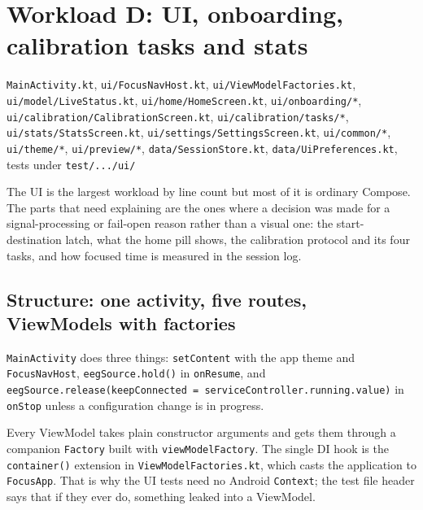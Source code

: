 \documentclass[10pt,a4paper]{article}
\newcommand{\file}[1]{\texttt{\small #1}}          %
\newcommand{\code}[1]{\texttt{#1}}                  %
\begin{document}
\section{Workload D: UI, onboarding, calibration tasks and stats}\label{sec:d}

\begin{files}
\file{MainActivity.kt}, \file{ui/FocusNavHost.kt}, \file{ui/ViewModelFactories.kt},
\file{ui/model/LiveStatus.kt}, \file{ui/home/HomeScreen.kt}, \file{ui/onboarding/*},
\file{ui/calibration/CalibrationScreen.kt}, \file{ui/calibration/tasks/*},
\file{ui/stats/StatsScreen.kt}, \file{ui/settings/SettingsScreen.kt}, \file{ui/common/*},
\file{ui/theme/*}, \file{ui/preview/*}, \file{data/SessionStore.kt}, \file{data/UiPreferences.kt},
tests under \file{test/.../ui/}
\end{files}

The UI is the largest workload by line count but most of it is ordinary Compose. The parts
that need explaining are the ones where a decision was made for a signal-processing or
fail-open reason rather than a visual one: the start-destination latch, what the home pill shows,
the calibration protocol and its four tasks, and how focused time is measured in the session log.

\subsection{Structure: one activity, five routes, ViewModels with factories}

\code{MainActivity} does three things: \code{setContent} with the app theme and \code{FocusNavHost},
\code{eegSource.hold()} in \code{onResume}, and \code{eegSource.release(keepConnected =
serviceController.running.value)} in \code{onStop} unless a configuration change is in progress.

Every ViewModel takes plain constructor arguments and gets them through a companion
\code{Factory} built with \code{viewModelFactory}. The single DI hook is the
\code{container()} extension in \file{ViewModelFactories.kt}, which casts the
application to \code{FocusApp}. That is why the UI tests need no Android \code{Context}; the test
file header says that if they ever do, something leaked into a ViewModel.
\end{document}
